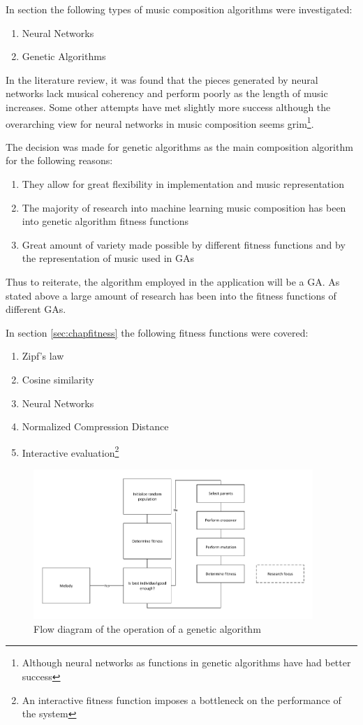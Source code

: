 In section \label{chap:comp_algo} the following types of music composition algorithms were investigated:
\begin{enumerate}
\item Neural Networks
\item Genetic Algorithms
\end{enumerate}
In the literature review, it was found that the pieces generated by neural networks lack musical coherency and perform poorly as the length of music increases. Some other attempts have met slightly more success although the overarching view for neural networks in music composition seems grim\footnote{Although neural networks as functions in genetic algorithms have had better success}.

The decision was made for genetic algorithms as the main composition algorithm for the following reasons:
\begin{enumerate}
\item They allow for great flexibility in implementation and music representation
\item The majority of research into machine learning music composition has been into genetic algorithm fitness functions
\item Great amount of variety made possible by different fitness functions and by the representation of music used in \acp{GA}
\end{enumerate}

Thus to reiterate, the algorithm employed in the application will be a \ac{GA}. As stated above a large amount of research has been into the fitness functions of different \acp{GA}.

In section \ref{sec:chapfitness} the following fitness functions were covered:
\begin{enumerate}
\item Zipf's law
\item Cosine similarity
\item Neural Networks
\item Normalized Compression Distance
\item Interactive evaluation\footnote{An interactive fitness function imposes a bottleneck on the performance of the system}
\end{enumerate}

\begin{figure}
\centerline{\includegraphics[width=400px]{../images/GA_flow.pdf}}
\caption{Flow diagram of the operation of a genetic algorithm}
\label{ims:geneticflow}
\end{figure}


